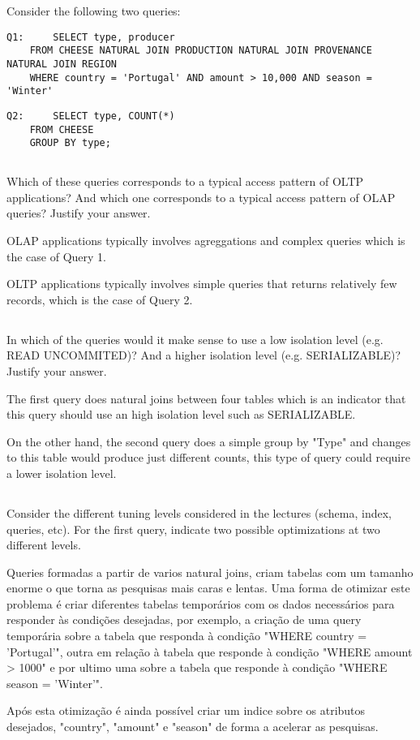 {\color{gray} Consider the following two queries:}
\begin{lstlisting}[frame=single]
Q1: 	SELECT type, producer
	FROM CHEESE NATURAL JOIN PRODUCTION NATURAL JOIN PROVENANCE NATURAL JOIN REGION
	WHERE country = 'Portugal' AND amount > 10,000 AND season = 'Winter'
\end{lstlisting}

\begin{lstlisting}[frame=single]
Q2: 	SELECT type, COUNT(*)
	FROM CHEESE
	GROUP BY type;
\end{lstlisting}

\subsection{}
{\color{gray}Which of these queries corresponds to a typical access pattern of OLTP applications? And which one corresponds to a typical access pattern of OLAP queries? Justify your answer.}

	OLAP applications typically involves agreggations and complex queries which is the case of Query 1. 

	OLTP applications typically involves simple queries that returns relatively few records, which is the case of Query 2.

\subsection{}
{\color{gray}In which of the queries would it make sense to use a low isolation level (e.g. READ UNCOMMITED)? And a higher isolation level (e.g. SERIALIZABLE)? Justify your answer.}

The first query does natural joins between four tables which is an indicator that this query should use an high isolation level such as SERIALIZABLE.

On the other hand, the second query does a simple group by "Type" and changes to this table would produce just different counts, this type of query could require a lower isolation level.

\subsection{}
{\color{gray} Consider the different tuning levels considered in the lectures (schema, index, queries, etc). For the first query, indicate two possible optimizations at two different levels.}

Queries formadas a partir de varios natural joins, criam tabelas com um tamanho enorme o que torna as pesquisas mais caras e lentas. Uma forma de otimizar este problema é criar diferentes tabelas temporários com os dados necessários para responder às condições desejadas, por exemplo, a criação de uma query temporária sobre a tabela que responda à condição "WHERE country = 'Portugal'", outra em relação à tabela que responde à condição "WHERE amount > 1000" e por ultimo uma sobre a tabela que responde à condição "WHERE season = 'Winter'".

Após esta otimização é ainda possível criar um indice sobre os atributos desejados, "country", "amount" e "season" de forma a acelerar as pesquisas. 

